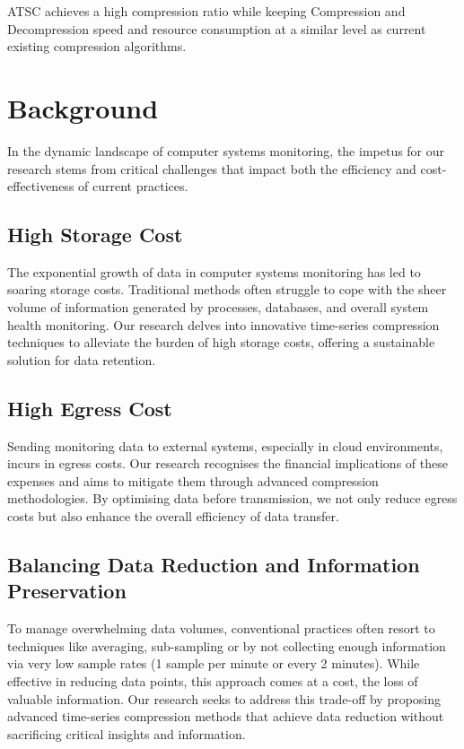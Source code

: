 \documentclass[conference]{IEEEtran}
\begin{document}
ATSC achieves a high compression ratio while keeping Compression and Decompression speed and resource consumption at a similar level as current existing compression algorithms.

\section{Background}

In the dynamic landscape of computer systems monitoring, the impetus for our research stems from critical challenges that impact both the efficiency and cost-effectiveness of current practices. 

\subsection{High Storage Cost}

The exponential growth of data in computer systems monitoring has led to soaring storage costs. Traditional methods often struggle to cope with the sheer volume of information generated by processes, databases, and overall system health monitoring. Our research delves into innovative time-series compression techniques to alleviate the burden of high storage costs, offering a sustainable solution for data retention. 

\subsection{High Egress Cost}
Sending monitoring data to external systems, especially in cloud environments, incurs in egress costs. Our research recognises the financial implications of these expenses and aims to mitigate them through advanced compression methodologies. By optimising data before transmission, we not only reduce egress costs but also enhance the overall efficiency of data transfer. 

\subsection{Balancing Data Reduction and Information Preservation}
To manage overwhelming data volumes, conventional practices often resort to techniques like averaging, sub-sampling or by not collecting enough information via very low sample rates (1 sample per minute or every 2 minutes). While effective in reducing data points, this approach comes at a cost, the loss of valuable information. Our research seeks to address this trade-off by proposing advanced time-series compression methods that achieve data reduction without sacrificing critical insights and information. 
\end{document}
